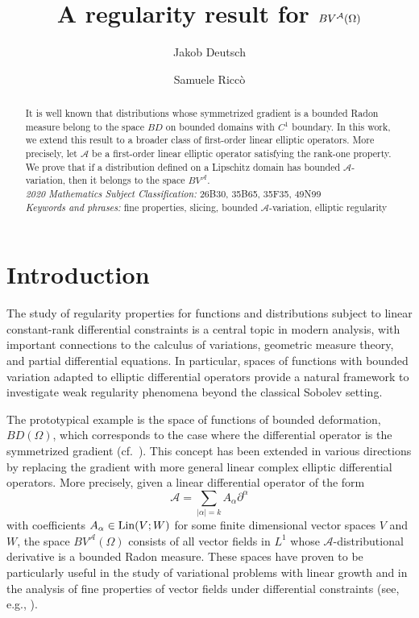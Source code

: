 \documentclass[11pt,reqno]{amsart}
\title{A regularity result for $BV^{\A}(\Omega)$}
\author[J. Deutsch]{Jakob Deutsch}
\author[S. Ricc\`o]{Samuele Ricc\`o}
\theoremstyle{plain}
\theoremstyle{definition}
\theoremstyle{remark}
\numberwithin{equation}{section}
\newcommand{\A}{\mathcal{A}}
\newcommand{\1}{\mathbbm{1}} %
\begin{document}
\begin{abstract}
    It is well known that distributions whose symmetrized gradient is a bounded Radon measure belong to the space $BD$ on bounded domains with $C^1$ boundary. In this work, we extend this result to a broader class of first-order linear elliptic operators. More precisely, let $\A$ be a first-order linear elliptic operator satisfying the rank-one property. We prove that if a distribution defined on a Lipschitz domain has bounded $\A$-variation, then it belongs to the space $BV^\A$.   \\[0.5cm]
    {\it 2020 Mathematics Subject Classification:} 26B30, 35B65, 35F35, 49N99
    \\
    {\it Keywords and phrases:} fine properties, slicing, bounded $\A$-variation, elliptic regularity
\end{abstract}

\maketitle


\thispagestyle{empty}


\section{Introduction}
\label{sec:intro}

The study of regularity properties for functions and distributions subject to linear constant-rank differential constraints is a central topic in modern analysis, with important connections to the calculus of variations, geometric measure theory, and partial differential equations. In particular, spaces of functions with bounded variation adapted to elliptic differential operators provide a natural framework to investigate weak regularity phenomena beyond the classical Sobolev setting. 

The prototypical example is the space of functions of bounded deformation, $BD(\Omega)$, which corresponds to the case where the differential operator is the symmetrized gradient (cf.\ \cite{temam}). This concept has been extended in various directions by replacing the gradient with more general linear complex elliptic differential operators. More precisely, given a linear differential operator of the form
$$
    \A = \sum_{|\alpha| = k}A_\alpha \partial^\alpha
$$ 
with coefficients $A_\alpha \in {\rm Lin}(V;W)$ for some finite dimensional vector spaces $V$ and $W$, the space $BV^{\mathcal{A}}(\Omega)$ consists of all vector fields in $L^1$ whose $\mathcal{A}$-distributional derivative is a bounded Radon measure. These spaces have proven to be particularly useful in the study of variational problems with linear growth and in the analysis of fine properties of vector fields under differential constraints (see, e.g., \cite{DT84, GR19_0, ARS25}).
\end{document}
